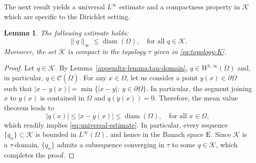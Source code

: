 \documentclass{article}
\newcommand{\boC}{\mathcal{C}}
\newcommand{\boK}{\mathcal{K}}
\newcommand{\Ebanach}{{\textnormal E}}
\newtheorem{lemma}{Lemma}[section]
\theoremstyle{definition}
\begin{document}
The next result yields a universal $L^\infty$ estimate and a compactness property in $\boK$ which are specific to the Dirichlet setting.

\begin{lemma}\label{appendix-lemma:convergence-PDE}
The following estimate holds:
\begin{equation}\label{eq:universal-estimate}
    \|q\|_\infty\leq\operatorname{diam}(\Omega),\quad\text{for all }q\in\boK.
\end{equation}
Moreover, the set $\boK$ is compact in the topology $\tau$ given in \eqref{eq:topology-K}. 
\end{lemma}
\begin{proof}
Let $q\in\boK$. By Lemma~\ref{appendix-lemma:tau-domain}, $q\in W^{1,\infty}(\Omega)$ and, in particular, $q\in\boC(\overline\Omega)$. For any $x\in\Omega$, let us consider a point $y(x)\in\partial\Omega$ such that $|x-y(x)|=\min\{|x-y|:\ y\in\partial\Omega\}$. In particular, the segment joining $x$ to $y(x)$ is contained in $\Omega$ and $q(y(x))=0$. Therefore, the mean value theorem leads to
\[|q(x)|\leq |x-y(x)|\leq\operatorname{diam}(\Omega),\quad\text{for all }x\in\Omega,\]
which readily implies \eqref{eq:universal-estimate}. In particular, every sequence $\{q_n\}\subset\boK$ is bounded in $L^\infty(\Omega)$, and hence in the Banach space $\Ebanach$. Since $\boK$ is a $\tau$-domain, $\{q_n\}$ admits a subsequence converging in $\tau$ to some $q\in\boK$, which completes the proof.
\end{proof}	
\end{document}
